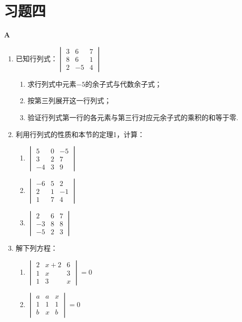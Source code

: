 \section*{习题四}
\begin{center}
  \bfseries A
\end{center}
\begin{enumerate}
  \item 已知行列式：$\begin{vmatrix}
    3&6&7\\ 8&6&1\\ 2&-5&4
  \end{vmatrix}$
\begin{enumerate}[(1)]
  \item 求行列式中元素$-5$的余子式与代数余子式；
  \item 按第三列展开这一行列式；
  \item 验证行列式第一行的各元素与第三行对应元余子式的乘积的和等于零.
\end{enumerate}

\item 利用行列式的性质和本节的定理1，计算：
\begin{multicols}{3}
\begin{enumerate}[(1)]
  \item $\begin{vmatrix}
    5&0&-5\\3&2&7\\-4&3&9
  \end{vmatrix}$
  \item $\begin{vmatrix}
    -6&5&2\\2&1&-1\\1&7&4
  \end{vmatrix}$
  \item $\begin{vmatrix}
    2&6&7\\ -3&8&8\\ -5&2&3
  \end{vmatrix}$
\end{enumerate}
\end{multicols}

\item 解下列方程：
\begin{multicols}{2}
\begin{enumerate}[(1)]
  \item $\begin{vmatrix}
    2&x+2&6\\ 1&x&3\\1&3&x
  \end{vmatrix}=0$
  \item $\begin{vmatrix}
    a&a&x\\1&1&1\\b&x&b
  \end{vmatrix}=0$
\end{enumerate}
\end{multicols}
\end{enumerate}

